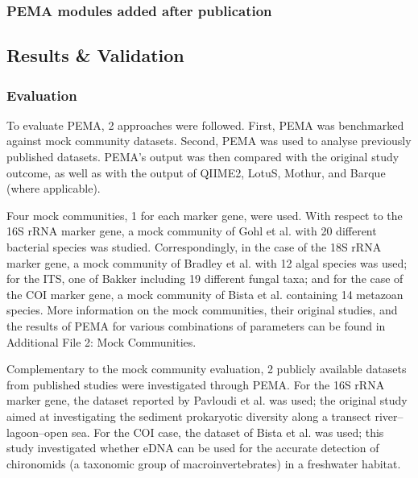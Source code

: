    \subsubsection*{PEMA modules added after publication} 


   \subsection{Results \& Validation}

   \subsubsection*{Evaluation}

      To evaluate PEMA, 2 approaches were followed. 
      First, PEMA was benchmarked against mock community datasets. 
      Second, PEMA was used to analyse previously published datasets. 
      PEMA's output was then compared with the original study outcome, as well as with the output of QIIME2, LotuS, Mothur, and Barque (where applicable).

      Four mock communities, 1 for each marker gene, were used. With respect to the 16S rRNA marker gene, a mock community of Gohl et al. \cite{gohl2016systematic} with 20 different bacterial species was studied. 
      Correspondingly, in the case of the 18S rRNA marker gene, a mock community of Bradley et al. \cite{bradley2016} with 12 algal species was used; 
      for the ITS, one of Bakker \cite{bakker2018fungal} including 19 different fungal taxa; 
      and for the case of the COI marker gene, a mock community of Bista et al. \cite{bista2018performance} containing 14 metazoan species. 
      More information on the mock communities, their original studies, and the results of PEMA for various combinations of parameters can be found in Additional File 2: Mock Communities.

      Complementary to the mock community evaluation, 2 publicly available datasets from published studies were investigated through PEMA. 
      For the 16S rRNA marker gene, the dataset reported by Pavloudi et al. \cite{pavloudi2017sediment} was used; 
      the original study aimed at investigating the sediment prokaryotic diversity along a transect river–lagoon–open sea. 
      For the COI case, the dataset of Bista et al. \cite{bista2017annual} was used; 
      this study investigated whether eDNA can be used for the accurate detection of chironomids (a taxonomic group of macroinvertebrates) in a freshwater habitat.

